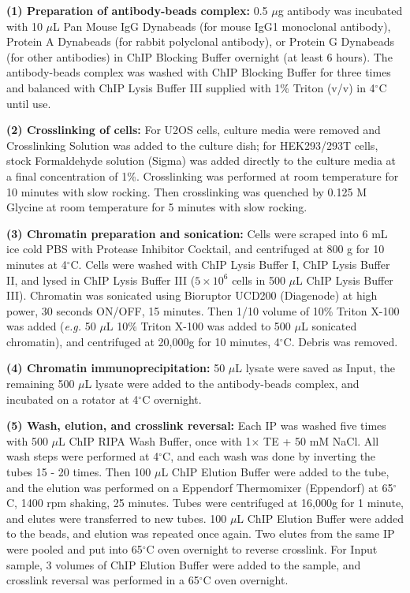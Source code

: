 \textbf{(1) Preparation of antibody-beads complex:} 0.5 $\mu$g antibody was incubated with 10 $\mu$L Pan Mouse IgG Dynabeads (for mouse IgG1 monoclonal antibody), Protein A Dynabeads (for rabbit polyclonal antibody), or Protein G Dynabeads (for other antibodies) in ChIP Blocking Buffer overnight (at least 6 hours). The antibody-beads complex was washed with ChIP Blocking Buffer for three times and balanced with ChIP Lysis Buffer III supplied with 1\% Triton (v/v) in 4$^\circ$C until use.

\textbf{(2) Crosslinking of cells:} For U2OS cells, culture media were removed and Crosslinking Solution was added to the culture dish; for HEK293/293T cells, stock Formaldehyde solution (Sigma) was added directly to the culture media at a final concentration of 1\%. Crosslinking was performed at room temperature for 10 minutes with slow rocking. Then crosslinking was quenched by 0.125 M Glycine at room temperature for 5 minutes with slow rocking.

\textbf{(3) Chromatin preparation and sonication:} Cells were scraped into 6 mL ice cold PBS with Protease Inhibitor Cocktail, and centrifuged at 800 g for 10 minutes at 4$^\circ$C. Cells were washed with ChIP Lysis Buffer I, ChIP Lysis Buffer II, and lysed in ChIP Lysis Buffer III ($5 \times 10^6$ cells in 500 $\mu$L ChIP Lysis Buffer III). Chromatin was sonicated using Bioruptor UCD200 (Diagenode) at high power, 30 seconds ON/OFF, 15 minutes. Then 1/10 volume of 10\% Triton X-100 was added (\textit{e.g.} 50 $\mu$L 10\% Triton X-100 was added to 500 $\mu$L sonicated chromatin), and centrifuged at 20,000g for 10 minutes, 4$^\circ$C. Debris was removed.

\textbf{(4) Chromatin immunoprecipitation:} 50 $\mu$L lysate were saved as Input, the remaining 500 $\mu$L lysate were added to the antibody-beads complex, and incubated on a rotator at 4$^\circ$C overnight.

\textbf{(5) Wash, elution, and crosslink reversal:} Each IP was washed five times with 500 $\mu$L ChIP RIPA Wash Buffer, once with 1$\times$ TE + 50 mM NaCl. All wash steps were performed at 4$^\circ$C, and each wash was done by inverting the tubes 15 - 20 times. Then 100 $\mu$L ChIP Elution Buffer were added to the tube, and the elution was performed on a Eppendorf Thermomixer (Eppendorf) at 65$^\circ$C, 1400 rpm shaking, 25 minutes. Tubes were centrifuged at 16,000g for 1 minute, and elutes were transferred to new tubes. 100 $\mu$L ChIP Elution Buffer were added to the beads, and elution was repeated once again. Two elutes from the same IP were pooled and put into 65$^\circ$C oven overnight to reverse crosslink. For Input sample, 3 volumes of ChIP Elution Buffer were added to the sample, and crosslink reversal was performed in a 65$^\circ$C oven overnight.

